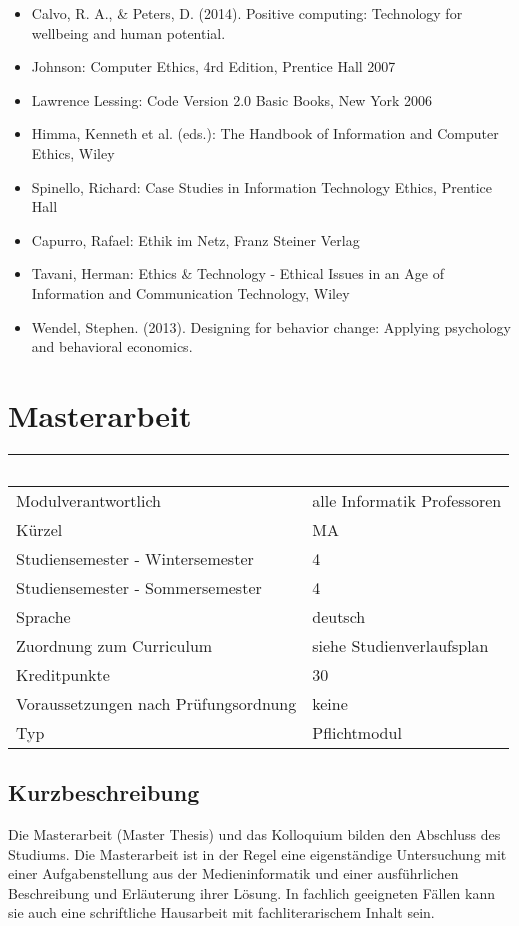 \begin{itemize}
\item
  Calvo, R. A., \& Peters, D. (2014). Positive computing: Technology for
  wellbeing and human potential.
\item
  Johnson: Computer Ethics, 4rd Edition, Prentice Hall 2007
\item
  Lawrence Lessing: Code Version 2.0 Basic Books, New York 2006
\item
  Himma, Kenneth et al. (eds.): The Handbook of Information and Computer
  Ethics, Wiley
\item
  Spinello, Richard: Case Studies in Information Technology Ethics,
  Prentice Hall
\item
  Capurro, Rafael: Ethik im Netz, Franz Steiner Verlag
\item
  Tavani, Herman: Ethics \& Technology - Ethical Issues in an Age of
  Information and Communication Technology, Wiley
\item
  Wendel, Stephen. (2013). Designing for behavior change: Applying
  psychology and behavioral economics.
\end{itemize}

\chapter{Masterarbeit}\label{masterarbeit}

\begin{longtable}[]{@{}ll@{}}
\toprule
~ & ~\tabularnewline
\midrule
\endhead
Modulverantwortlich & alle Informatik Professoren\tabularnewline
Kürzel & MA\tabularnewline
Studiensemester - Wintersemester & 4\tabularnewline
Studiensemester - Sommersemester & 4\tabularnewline
Sprache & deutsch\tabularnewline
Zuordnung zum Curriculum & siehe Studienverlaufsplan\tabularnewline
Kreditpunkte & 30\tabularnewline
Voraussetzungen nach Prüfungsordnung & keine\tabularnewline
Typ & Pflichtmodul\tabularnewline
\bottomrule
\end{longtable}

\section*{Kurzbeschreibung}\label{kurzbeschreibung}

Die Masterarbeit (Master Thesis) und das Kolloquium bilden den Abschluss
des Studiums. Die Masterarbeit ist in der Regel eine eigenständige
Untersuchung mit einer Aufgabenstellung aus der Medieninformatik und
einer ausführlichen Beschreibung und Erläuterung ihrer Lösung. In
fachlich geeigneten Fällen kann sie auch eine schriftliche Hausarbeit
mit fachliterarischem Inhalt sein.

